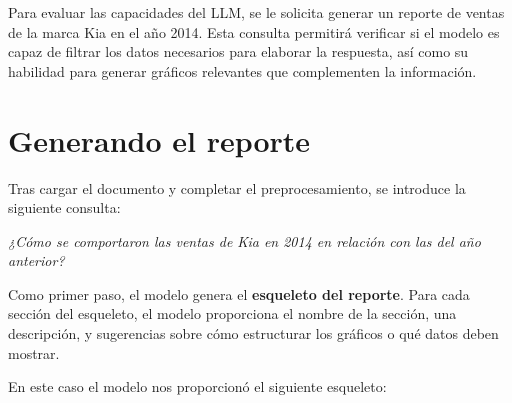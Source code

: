 Para evaluar las capacidades del LLM, se le solicita generar un reporte de ventas de la marca Kia en el año 2014. Esta consulta permitirá verificar si el modelo es capaz de filtrar los datos necesarios para elaborar la respuesta, así como su habilidad para generar gráficos relevantes que complementen la información. 

\section{Generando el reporte}
Tras cargar el documento y completar el preprocesamiento, se introduce la siguiente consulta:

\textit{¿Cómo se comportaron las ventas de Kia en 2014 en relación con las del año anterior?}

Como primer paso, el modelo genera el \textbf{esqueleto del reporte}. Para cada sección del esqueleto, el modelo proporciona el nombre de la sección, una descripción, y sugerencias sobre cómo estructurar los gráficos o qué datos deben mostrar.

En este caso el modelo nos proporcionó el siguiente esqueleto:

